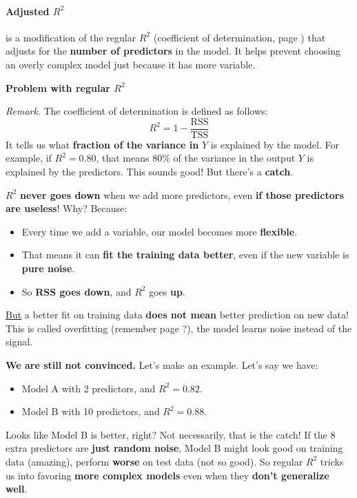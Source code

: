 \paragraph{Adjusted $R^2$}\label{paragraph: Adjusted R2}

 is a modification of the regular $R^2$ (coefficient of determination, page \pageref{eq: coefficient of determination}) that adjusts for the \textbf{number of predictors} in the model. It helps prevent choosing an overly complex model just because it has more variable.

\highspace
\begin{flushleft}
    \textcolor{Red2}{ \textbf{Problem with regular $R^2$}}
\end{flushleft}
\emph{Remark}. The coefficient of determination is defined as follows:
\begin{equation*}
    R^2 = 1 - \frac{\text{RSS}}{\text{TSS}}
\end{equation*}
It tells us what \textbf{fraction of the variance in} $Y$ is explained by the model. For example, if $R^2 = 0.80$, that means $80\%$ of the variance in the output $Y$ is explained by the predictors. This sounds good! But there's a \textbf{catch}.

\highspace
$R^2$ \textbf{never goes down} when we add more predictors, even \textbf{if those predictors are useless}! Why? Because:
\begin{itemize}
    \item Every time we add a variable, our model becomes more \textbf{flexible}.
    \item That means it can \textbf{fit the training data better}, even if the new variable is \textbf{pure noise}.
    \item So \textbf{RSS goes down}, and $R^2$ goes \textbf{up}.
\end{itemize}
\underline{But} a better fit on training data \textbf{does not mean} better prediction on new data! This is called overfitting (remember page \pageref{def: Overfitting}?), the model learns noise instead of the signal.

\highspace
\textcolor{Green3}{ \textbf{We are still not convinced.}} Let's make an example. Let's say we have:
\begin{itemize}
    \item Model A with 2 predictors, and $R^2 = 0.82$.
    \item Model B with 10 predictors, and $R^2 = 0.88$.
\end{itemize}
Looks like Model B is better, right? Not necessarily, that is the catch! If the 8 extra predictors are \textbf{just random noise}, Model B might look good on training data (amazing), perform \textbf{worse} on test data (not so good). So regular $R^2$ tricks us into favoring \textbf{more complex models} even when they \textbf{don't generalize well}.

